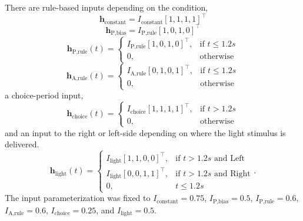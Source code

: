 \documentclass[11pt]{article}
\begin{document}
There are rule-based inputs depending on the condition,
\begin{equation} 
\mathbf{h}_{\text{constant}} = I_{\text{constant}} [1, 1, 1, 1]^\top
\end{equation}
\begin{equation} 
\mathbf{h}_{\text{P,bias}} = I_{\text{P,rule}} [1, 0, 1, 0]^\top
\end{equation}
\begin{equation} \mathbf{h}_{\text{P,rule}}(t) = \begin{cases}
                           I_{\text{P,rule}} [1, 0, 1, 0]^\top,& \text{if } t\leq 1.2s \\
                            0,              & \text{otherwise}
                         \end{cases}
\end{equation}
\begin{equation} \mathbf{h}_{\text{A,rule}}(t) = \begin{cases}
                           I_{\text{A,rule}} [0, 1, 0, 1]^\top,& \text{if } t\leq 1.2s \\
                            0,              & \text{otherwise}
                         \end{cases}
\end{equation}
a choice-period input,
\begin{equation} \mathbf{h}_{\text{choice}}(t) = \begin{cases}
                           I_{\text{choice}} [1, 1, 1, 1]^\top,& \text{if } t > 1.2s \\
                            0,              & \text{otherwise}
                         \end{cases}
\end{equation}
and an input to the right or left-side depending on where the light stimulus is delivered.     
\begin{equation}  \mathbf{h}_{\text{light}}(t) = \begin{cases}
                           I_{\text{light}} [1, 1, 0, 0]^\top,& \text{if } t > 1.2s \text{ and Left} \\
                           I_{\text{light}} [0, 0, 1, 1]^\top,& \text{if } t > 1.2s \text{ and Right} \\
                            0,              & t \leq 1.2s
                         \end{cases} .
\end{equation}
The input parameterization was fixed to $I_{\text{constant}} = 0.75$, $I_{\text{P,bias}} = 0.5 $, $I_{\text{P,rule}} = 0.6$,  $I_{\text{A,rule}} = 0.6$,  $I_{\text{choice}} = 0.25$,  and $I_{\text{light}} = 0.5$.
\end{document}
